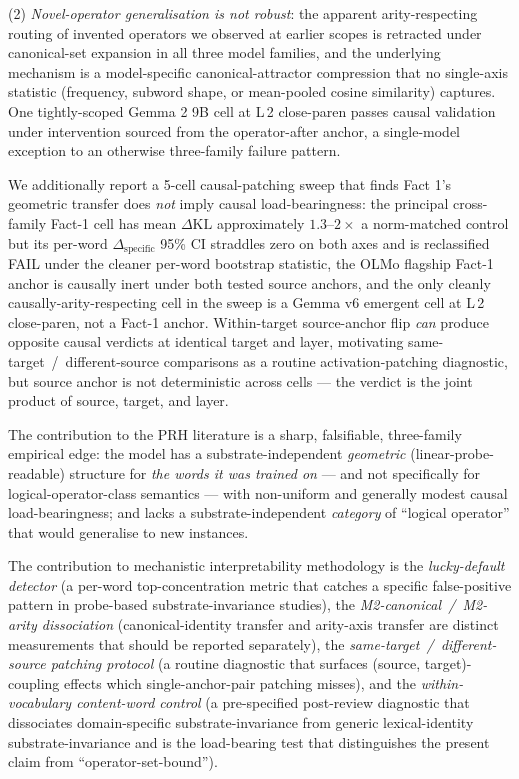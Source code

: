 \documentclass[11pt,letterpaper]{article}
\newcommand{\dkl}{\ensuremath{\Delta\mathrm{KL}}}
\newcommand{\dspec}{\ensuremath{\Delta_{\text{specific}}}}
\newcommand{\Mc}{M2-canonical}
\newcommand{\Ma}{M2-arity}
\begin{document}
(2) \emph{Novel-operator generalisation is not robust}: the apparent
arity-respecting routing of invented operators we observed at earlier
scopes is retracted under canonical-set expansion in all three model
families, and the underlying mechanism is a model-specific
canonical-attractor compression that no single-axis statistic
(frequency, subword shape, or mean-pooled cosine similarity) captures.
One tightly-scoped Gemma 2 9B cell at L\,2 close-paren passes causal
validation under intervention sourced from the operator-after anchor,
a single-model exception to an otherwise three-family failure pattern.

We additionally report a 5-cell causal-patching sweep that finds Fact 1's
geometric transfer does \emph{not} imply causal load-bearingness: the
principal cross-family Fact-1 cell has mean \dkl{} approximately
$1.3$--$2\times$ a norm-matched control but its per-word \dspec{} 95\%
CI straddles zero on both axes and is reclassified FAIL under the
cleaner per-word bootstrap statistic, the OLMo flagship Fact-1 anchor
is causally inert under both tested source anchors, and the only
cleanly causally-arity-respecting cell in the sweep is a Gemma v6
emergent cell at L\,2 close-paren, not a Fact-1 anchor. Within-target
source-anchor flip \emph{can} produce opposite causal verdicts at
identical target and layer, motivating same-target~/~different-source
comparisons as a routine activation-patching diagnostic, but source
anchor is not deterministic across cells --- the verdict is the joint
product of source, target, and layer.

The contribution to the PRH literature is a sharp, falsifiable,
three-family empirical edge: the model has a substrate-independent
\emph{geometric} (linear-probe-readable) structure for \emph{the words
it was trained on} --- and not specifically for logical-operator-class
semantics --- with non-uniform and generally modest causal
load-bearingness; and lacks a substrate-independent \emph{category} of
``logical operator'' that would generalise to new instances.

The contribution to mechanistic interpretability methodology is the
\emph{lucky-default detector} (a per-word top-concentration metric
that catches a specific false-positive pattern in probe-based
substrate-invariance studies), the \emph{\Mc{}~/~\Ma{} dissociation}
(canonical-identity transfer and arity-axis transfer are distinct
measurements that should be reported separately), the
\emph{same-target~/~different-source patching protocol} (a routine
diagnostic that surfaces (source, target)-coupling effects which
single-anchor-pair patching misses), and the \emph{within-vocabulary
content-word control} (a pre-specified post-review diagnostic that
dissociates domain-specific substrate-invariance from generic
lexical-identity substrate-invariance and is the load-bearing test
that distinguishes the present claim from ``operator-set-bound'').
\end{document}
